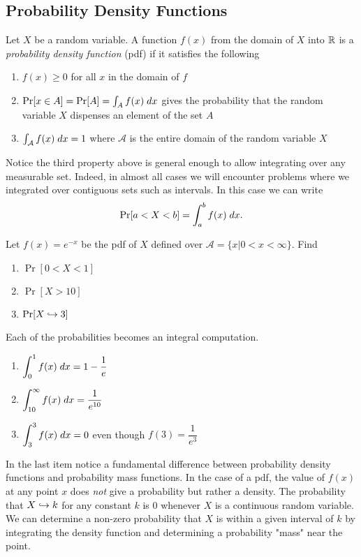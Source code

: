 \documentclass[../main.tex]{subfiles}
\begin{document}
\subsection{Probability Density Functions}
\begin{definition}
Let $X$ be a random variable. A function $f(x)$ from the domain of $X$ into $\mathbb{R}$ is a \textit{probability density function} (pdf) if it satisfies the following
\begin{enumerate}
    \item $f(x) \geq 0$ for all $x$ in the domain of $f$
    \item $\mathrm{Pr}[x \in A] = \mathrm{Pr}[A] = \int_A f(x) \;dx$ gives the probability
    that the random variable $X$ dispenses an element of the set $A$
    \item $\int_\mathcal{A} f(x) \;dx = 1$ where $\mathcal{A}$ is the entire domain
    of the random variable $X$
\end{enumerate}
\end{definition}
%
Notice the third property above is general enough to allow integrating over any measurable set. Indeed, in almost
all cases we will encounter problems where we integrated over contiguous sets such as intervals. In this case we can write
$$\mathrm{Pr}[a < X < b] = \int_a^b f(x) \;dx.$$
\begin{example}
    Let $f(x)=e^{-x}$ be the pdf of $X$ defined over $\mathcal{A} = \{x | 0<x<\infty\}$. Find
    \begin{enumerate}
        \item $\Pr[0<X<1]$
        \item $\Pr[X>10]$
        \item $\mathrm{Pr}[X \hookrightarrow 3]$
    \end{enumerate}
\end{example}
\begin{solution}
Each of the probabilities becomes an integral computation.
    \begin{enumerate}
        \item $\displaystyle \int_0^1 f(x)\;dx = 1-\dfrac{1}{e}$
        \item $\displaystyle \int_{10}^\infty f(x)\;dx = \dfrac{1}{e^{10}}$
        \item $\displaystyle \int_3^3 f(x)\;dx = 0 $ even though $f(3) = \dfrac{1}{e^3}$
    \end{enumerate}
In the last item notice a fundamental difference between probability density functions and probability mass functions.
In the case of a pdf, the value of $f(x)$ at any point $x$ does \textit{not} give a probability but rather a density.
The probability that $X \hookrightarrow k$ for any constant $k$ is 0 whenever $X$ is a continuous random variable. We can determine
a non-zero probability that $X$ is within a given interval of $k$ by integrating the density function and determining a probability "mass" near the point.
\end{solution}
\end{document}
